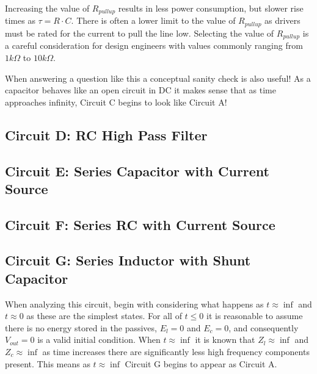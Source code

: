 \documentclass[main.tex]{subfiles}
\begin{document}

Increasing the value of $R_{pullup}$ results in less power consumption, but slower rise times as $\tau = R \cdot C$. There is often a lower limit to the value of $R_{pullup}$ as drivers must be rated for the current to pull the line low. Selecting the value of $R_{pullup}$ is a careful consideration for design engineers with values commonly ranging from $1 k \Omega$ to $10 k \Omega$.


When answering a question like this a conceptual sanity check is also useful! As a capacitor behaves like an open circuit in DC it makes sense that as time approaches infinity, Circuit C begins to look like Circuit A! 

\subsection{Circuit D: RC High Pass Filter}

\subsection{Circuit E: Series Capacitor with Current Source}

\subsection{Circuit F: Series RC with Current Source}

\subsection{Circuit G: Series Inductor with Shunt Capacitor}
When analyzing this circuit, begin with considering what happens as $t \approx \inf$ and $t \approx 0$ as these are the simplest states. For all of $t \leq 0$ it is reasonable to assume there is no energy stored in the passives, $E_l = 0$ and $E_c = 0$, and consequently $V_{out} = 0$ is a valid initial condition. When $t \approx \inf$ it is known that $Z_l \approx \inf$ and $Z_c \approx \inf$ as time increases there are significantly less high frequency components present. This means as $t \approx \inf$ Circuit G begins to appear as Circuit A. 

\end{document}
